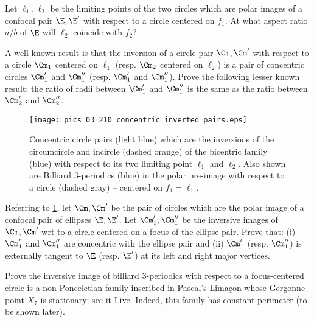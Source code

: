 \begin{exercise}
Let $\ell_1,\ell_2$ be the limiting points of the two circles which are polar images of a confocal pair $\E,\E'$ with respect to a circle centered on $f_1$. At what aspect ratio $a/b$ of $\E$ will $\ell_2$ coincide with $f_2$?
\end{exercise}

\begin{exercise}
A well-known result is that the inversion of a circle pair $\Cm,\Cm'$ with respect to a circle $\Cm_1$ centered on $\ell_1$ (resp. $\Cm_2$ centered on $\ell_2$) is a pair of concentric circles $\Cm_1'$ and $\Cm_1''$ (resp. $\Cm_1'$ and $\Cm_1''$). Prove the following lesser known result: the ratio of radii between $\Cm_1'$ and $\Cm_1''$ is the same as the ratio between $\Cm_2'$ and $\Cm_2''$. 
\end{exercise}


\begin{figure}
    \centering
    \texttt{[image: pics\_03\_210\_concentric\_inverted\_pairs.eps]}
    \caption{Concentric circle pairs (light blue) which are the inversions of the circumcircle and incircle (dashed orange) of the bicentric family  (blue) with respect to its two limiting point $\ell_1$ and $\ell_2$. Also shown are Billiard 3-periodics (blue) in the polar pre-image with respect to a circle (dashed gray) -- centered on $f_1=\ell_1$.}
    \label{fig:03-concentric-inverted}
\end{figure}

\begin{exercise}
Referring to \cref{fig:03-concentric-inverted}, let $\Cm,\Cm'$ be the pair of circles which are the polar image of a confocal pair of ellipses $\E,\E'$. Let $\Cm_1', \Cm_1''$ be the inversive images of $\Cm,\Cm'$ wrt to a circle centered on a focus of the ellipse pair. Prove that: (i) $\Cm_1'$ and $\Cm_1''$ are concentric with the ellipse pair and (ii) $\Cm_1'$ (resp. $\Cm_1''$) is externally tangent to $\E$ (resp. $\E'$) at its left and right major vertices.
\end{exercise}


\begin{exercise}
Prove the inversive image of billiard 3-periodics with respect to a focus-centered circle is a non-Ponceletian family inscribed in Pascal's Limaçon whose Gergonne point $X_7$ is stationary; see it \href{https://bit.ly/3edwKD7}{Live}. Indeed, this family has constant perimeter (to be shown later).
\end{exercise}

